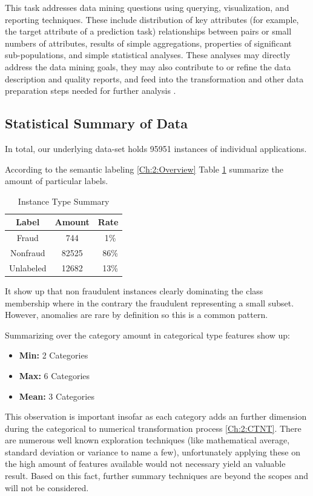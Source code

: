 This task addresses data mining questions using querying, visualization, and reporting techniques. These include distribution of key attributes (for example, the target attribute of a prediction task) relationships between pairs or small numbers of attributes, results of simple aggregations, properties of significant sub-populations, and simple statistical analyses. These analyses may directly address the data mining goals, they may also contribute to or refine the data description and quality reports, and feed into the transformation and other data preparation steps needed for further analysis \cite{crisp} .

\subsection{Statistical Summary of Data}\label{Ch:2:SSummary}

In total, our underlying data-set holds 95951 instances of individual applications.

According to the semantic labeling \ref{Ch:2:Overview} Table \ref{tab:instance-summary} summarize the amount of particular labels.

\begin{table}[h!]
  \begin{center}
    \caption{Instance Type Summary}
    \label{tab:instance-summary}
    \begin{tabular}{c|c|c}
    Label & Amount & Rate \\
      \hline
     Fraud & 744 & ~1\% \\ 
     \hline
     Nonfraud & 82525 &  ~86\% \\
     \hline
     Unlabeled & 12682 &  ~13\% \\
     \hline
    \end{tabular}
  \end{center}
\end{table}
It show up that non fraudulent instances clearly dominating the class membership where in the contrary the fraudulent representing a small subset. However, anomalies are rare by definition so this is a common pattern.

Summarizing over the category amount in categorical type features show up: 
\begin{itemize}
    \item \textbf{Min: } 2 Categories
    \item \textbf{Max: } 6 Categories
    \item \textbf{Mean:} 3 Categories
\end{itemize}
This observation is important insofar as each category adds an further dimension during the categorical to numerical transformation process \ref{Ch:2:CTNT}.
There are numerous well known exploration techniques (like mathematical average, standard deviation or variance to name a few), unfortunately applying these on the high amount of features available would not necessary yield an valuable result. Based on this fact, further summary techniques are beyond the scopes and will not be considered.
